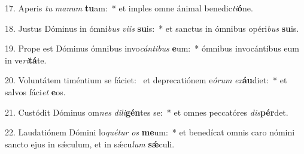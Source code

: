 17. Aperis \textit{tu} \textit{ma}\textit{num} \textbf{tu}am:~*  et imples omne ánimal benedic\textit{ti}\textbf{ó}ne.\

18. Justus Dóminus in ómni\textit{bus} \textit{vi}\textit{is} \textbf{su}is:~*  et sanctus in ómnibus opéri\textit{bus} \textbf{su}is.\

19. Prope est Dóminus ómnibus invo\textit{cán}\textit{ti}\textit{bus} \textbf{e}um:~*  ómnibus invocántibus eum in ve\textit{ri}\textbf{tá}te.\

20. Voluntátem timéntium se fáciet: \dag\  et deprecatiónem e\textit{ó}\textit{rum} \textit{ex}\textbf{áu}diet:~*  et salvos fáci\textit{et} \textbf{e}os.\

21. Custódit Dóminus om\textit{nes} \textit{di}\textit{li}\textbf{gén}tes se:~*  et omnes peccatóres \textit{dis}\textbf{pér}det.\

22. Laudatiónem Dómini lo\textit{qué}\textit{tur} \textit{os} \textbf{me}um:~*  et benedícat omnis caro nómini sancto ejus in sǽculum, et in sǽcu\textit{lum} \textbf{sǽ}culi.\


